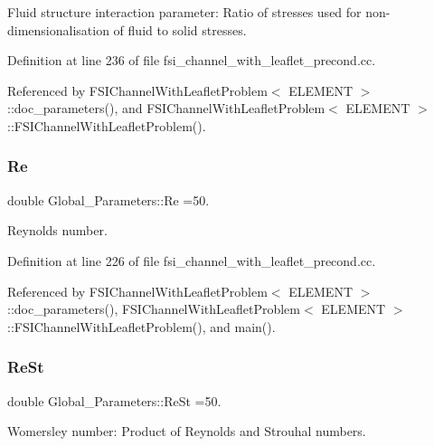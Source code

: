 Fluid structure interaction parameter\+: Ratio of stresses used for non-\/dimensionalisation of fluid to solid stresses. 



Definition at line 236 of file fsi\+\_\+channel\+\_\+with\+\_\+leaflet\+\_\+precond.\+cc.



Referenced by F\+S\+I\+Channel\+With\+Leaflet\+Problem$<$ E\+L\+E\+M\+E\+N\+T $>$\+::doc\+\_\+parameters(), and F\+S\+I\+Channel\+With\+Leaflet\+Problem$<$ E\+L\+E\+M\+E\+N\+T $>$\+::\+F\+S\+I\+Channel\+With\+Leaflet\+Problem().

\mbox{\label{namespaceGlobal__Parameters_a9d72e94a9305c6a310940a6a427ebe06}} 
\subsubsection{\texorpdfstring{Re}{Re}}
{\footnotesize\ttfamily double Global\+\_\+\+Parameters\+::\+Re =50.}



Reynolds number. 



Definition at line 226 of file fsi\+\_\+channel\+\_\+with\+\_\+leaflet\+\_\+precond.\+cc.



Referenced by F\+S\+I\+Channel\+With\+Leaflet\+Problem$<$ E\+L\+E\+M\+E\+N\+T $>$\+::doc\+\_\+parameters(), F\+S\+I\+Channel\+With\+Leaflet\+Problem$<$ E\+L\+E\+M\+E\+N\+T $>$\+::\+F\+S\+I\+Channel\+With\+Leaflet\+Problem(), and main().

\mbox{\label{namespaceGlobal__Parameters_a7a59a32365e87566069e458dc83bd18a}} 
\subsubsection{\texorpdfstring{Re\+St}{ReSt}}
{\footnotesize\ttfamily double Global\+\_\+\+Parameters\+::\+Re\+St =50.}



Womersley number\+: Product of Reynolds and Strouhal numbers. 



